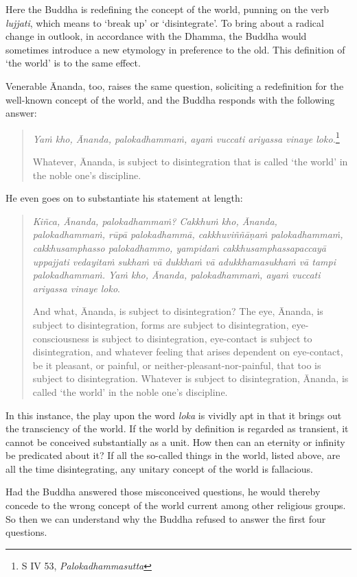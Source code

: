 Here the Buddha is redefining the concept of the world, punning on the verb \emph{lujjati}, which means to `break up' or `disintegrate'. To bring about a radical change in outlook, in accordance with the Dhamma, the Buddha would sometimes introduce a new etymology in preference to the old. This definition of `the world' is to the same effect.

Venerable Ānanda, too, raises the same question, soliciting a redefinition for the well-known concept of the world, and the Buddha responds with the following answer:

\begin{quote}
\emph{Yaṁ kho, Ānanda, palokadhammaṁ, ayaṁ vuccati ariyassa vinaye loko.}\footnote{S IV 53, \emph{Palokadhammasutta}}

Whatever, Ānanda, is subject to disintegration that is called `the world' in the noble one's discipline.
\end{quote}

He even goes on to substantiate his statement at length:

\begin{quote}
\emph{Kiñca, Ānanda, palokadhammaṁ? Cakkhuṁ kho, Ānanda, palokadhammaṁ, rūpā palokadhammā, cakkhuviññāṇaṁ palokadhammaṁ, cakkhusamphasso palokadhammo, yampidaṁ cakkhusamphassapaccayā uppajjati vedayitaṁ sukhaṁ vā dukkhaṁ vā adukkhamasukhaṁ vā tampi palokadhammaṁ. Yaṁ kho, Ānanda, palokadhammaṁ, ayaṁ vuccati ariyassa vinaye loko}.

And what, Ānanda, is subject to disintegration? The eye, Ānanda, is subject to disintegration, forms are subject to disintegration, eye-consciousness is subject to disintegration, eye-contact is subject to disintegration, and whatever feeling that arises dependent on eye-contact, be it pleasant, or painful, or neither-pleasant-nor-painful, that too is subject to disintegration. Whatever is subject to disintegration, Ānanda, is called `the world' in the noble one's discipline.
\end{quote}

In this instance, the play upon the word \emph{loka} is vividly apt in that it brings out the transciency of the world. If the world by definition is regarded as transient, it cannot be conceived substantially as a unit. How then can an eternity or infinity be predicated about it? If all the so-called things in the world, listed above, are all the time disintegrating, any unitary concept of the world is fallacious.

Had the Buddha answered those misconceived questions, he would thereby concede to the wrong concept of the world current among other religious groups. So then we can understand why the Buddha refused to answer the first four questions.

